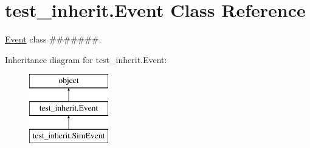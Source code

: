 \hypertarget{classtest__inherit_1_1_event}{\section{test\-\_\-inherit.\-Event Class Reference}
\label{classtest__inherit_1_1_event}
}


\hyperlink{classtest__inherit_1_1_event}{Event} class \#\#\#\#\#\#\#.  


Inheritance diagram for test\-\_\-inherit.\-Event\-:\begin{figure}[H]
\begin{center}
\leavevmode
\includegraphics[height=3.000000cm]{classtest__inherit_1_1_event}
\end{center}
\end{figure}
